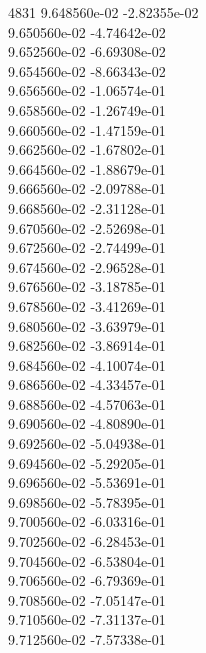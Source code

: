 4831	9.648560e-02	-2.82355e-02	\\ 	9.650560e-02	-4.74642e-02	\\ 	9.652560e-02	-6.69308e-02	\\ 	9.654560e-02	-8.66343e-02	\\ 	9.656560e-02	-1.06574e-01	\\ 	9.658560e-02	-1.26749e-01	\\ 	9.660560e-02	-1.47159e-01	\\ 	9.662560e-02	-1.67802e-01	\\ 	9.664560e-02	-1.88679e-01	\\ 	9.666560e-02	-2.09788e-01	\\ 	9.668560e-02	-2.31128e-01	\\ 	9.670560e-02	-2.52698e-01	\\ 	9.672560e-02	-2.74499e-01	\\ 	9.674560e-02	-2.96528e-01	\\ 	9.676560e-02	-3.18785e-01	\\ 	9.678560e-02	-3.41269e-01	\\ 	9.680560e-02	-3.63979e-01	\\ 	9.682560e-02	-3.86914e-01	\\ 	9.684560e-02	-4.10074e-01	\\ 	9.686560e-02	-4.33457e-01	\\ 	9.688560e-02	-4.57063e-01	\\ 	9.690560e-02	-4.80890e-01	\\ 	9.692560e-02	-5.04938e-01	\\ 	9.694560e-02	-5.29205e-01	\\ 	9.696560e-02	-5.53691e-01	\\ 	9.698560e-02	-5.78395e-01	\\ 	9.700560e-02	-6.03316e-01	\\ 	9.702560e-02	-6.28453e-01	\\ 	9.704560e-02	-6.53804e-01	\\ 	9.706560e-02	-6.79369e-01	\\ 	9.708560e-02	-7.05147e-01	\\ 	9.710560e-02	-7.31137e-01	\\ 	9.712560e-02	-7.57338e-01	\\ \hline
